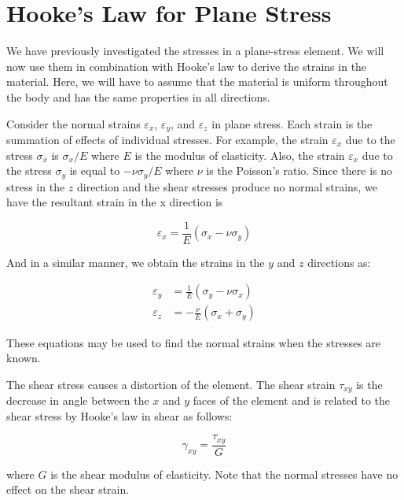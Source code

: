 \documentclass[
fontsize=10pt,
a4paper,
twosides=false,
open=any,
svgnames,
]{kaobook} %
\begin{document}
\section{Hooke’s Law for Plane Stress}

We have previously investigated the stresses in a plane-stress element. We will now use them in combination with Hooke’s law to derive the strains in the material. Here, we will have to assume that the material is uniform throughout the body and has the same properties in all directions.

Consider the normal strains $\varepsilon_x$, $\varepsilon_y$, and $\varepsilon_z$ in plane stress. Each strain is the summation of effects of individual stresses. For example, the strain $\varepsilon_x$ due to the stress $\sigma_x$ is $\sigma_x / E$ where $E$ is the modulus of elasticity. Also, the strain $\varepsilon_x$ due to the stress $\sigma_y$ is equal to $-\nu \sigma_y / E$ where $\nu$ is the Poisson’s ratio. Since there is no stress in the $z$ direction and the shear stresses produce no normal strains, we have the resultant strain in the x direction is

\begin{equation} \label{eqn: plane stress x}
  \varepsilon_x = \frac{1}{E}(\sigma_x - \nu \sigma_y)
\end{equation}

And in a similar manner, we obtain the strains in the $y$ and $z$ directions as:

\begin{align} \label{eqn: plane stress y and z}
  \varepsilon_y &= \frac{1}{E}(\sigma_y - \nu \sigma_x) \nonumber \\
  \varepsilon_z &=  - \frac{\nu }{E}(\sigma_x + \sigma_y)
\end{align}

These equations may be used to find the normal strains when the stresses are known.

The shear stress causes a distortion of the element. The shear strain $\tau_{xy}$ is the decrease in angle between the $x$ and $y$ faces of the element and is related to the shear stress by Hooke’s law in shear as follows:

\begin{equation}
  \gamma_{xy} = \frac{\tau_{xy}}{G}
\end{equation}

where $G$ is the shear modulus of elasticity. Note that the normal stresses have no effect on the shear strain.
\end{document}
